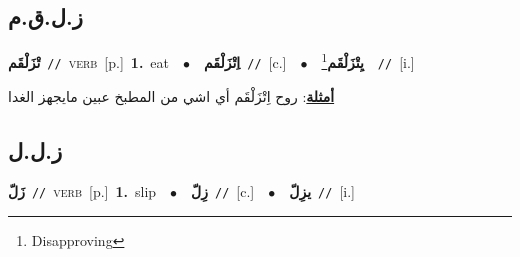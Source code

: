 \documentclass[10pt,a4paper,twoside]{article} %
\begin{document}
\begin{multicols}{2}
\vspace{-3mm}
\subsection*{\color{blue}\foreignlanguage{arabic}{ز.ل.ق.م}\color{blue}{}} 

{\setlength\topsep{0pt}\textbf{\foreignlanguage{arabic}{تْزَلْقَم}}\ {\color{gray}\texttt{//}\color{black}}\ \textsc{verb}\ [p.]\ \textbf{1.}~eat\ \ $\bullet$\ \ \setlength\topsep{0pt}\textbf{\foreignlanguage{arabic}{اِتْزَلْقَم}}\ {\color{gray}\texttt{//}\color{black}}\ [c.]\ \ $\bullet$\ \ \setlength\topsep{0pt}\textbf{\foreignlanguage{arabic}{يِتْزَلْقَم}}\footnote{Disapproving}\ \ {\color{gray}\texttt{//}\color{black}}\ [i.]\  \begin{flushright}\color{gray}\foreignlanguage{arabic}{\textbf{\underline{\foreignlanguage{arabic}{أمثلة}}}: روح اِتْزَلْقَم أي اشي من المطبخ عبين مايجهز الغدا}\end{flushright}\color{black}} \vspace{2mm}

\vspace{-3mm}
\subsection*{\color{blue}\foreignlanguage{arabic}{ز.ل.ل}\color{blue}{}} 

{\setlength\topsep{0pt}\textbf{\foreignlanguage{arabic}{زَلّ}}\ {\color{gray}\texttt{//}\color{black}}\ \textsc{verb}\ [p.]\ \textbf{1.}~slip\ \ $\bullet$\ \ \setlength\topsep{0pt}\textbf{\foreignlanguage{arabic}{زِلّ}}\ {\color{gray}\texttt{//}\color{black}}\ [c.]\ \ $\bullet$\ \ \setlength\topsep{0pt}\textbf{\foreignlanguage{arabic}{يزِلّ}}\ {\color{gray}\texttt{//}\color{black}}\ [i.]\ } \vspace{2mm}


\end{multicols}
\end{document}
